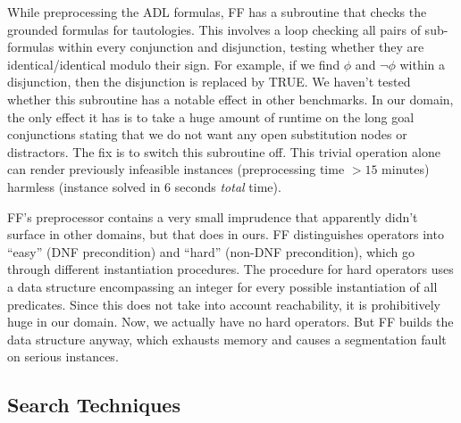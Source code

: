 While preprocessing the ADL formulas, FF has a subroutine that
checks the grounded formulas
for tautologies. This involves a loop checking all pairs of
sub-formulas within every conjunction and disjunction, testing whether
they are identical/identical modulo their sign. For example, if we
find $\phi$ and $\neg \phi$ within a disjunction, then the disjunction
is replaced by TRUE. We haven't tested whether this subroutine has a
notable effect in other benchmarks. In our domain, the only effect it
has is to take a huge amount of runtime on the long goal conjunctions
stating that we do not want any open substitution nodes or
distractors. The fix is to switch this subroutine off. This trivial
operation alone can render previously infeasible instances
(preprocessing time $>15$ minutes) harmless (instance solved in $6$
seconds {\em total} time).



FF's preprocessor contains a very small imprudence that apparently
didn't surface in other domains, but that does in ours. FF
distinguishes operators into ``easy'' (DNF precondition) and ``hard''
(non-DNF precondition), which go through different instantiation
procedures. The procedure for hard operators uses a data structure
encompassing an integer for every possible instantiation of all
predicates. Since this does not take into account reachability, it is
prohibitively huge in our domain. Now, we actually have no hard
operators. But FF builds the data structure anyway, which exhausts
memory and causes a segmentation fault on serious instances.




















\subsection{Search Techniques}
\label{sec:crisp-ff:preprocess:heuristics}





